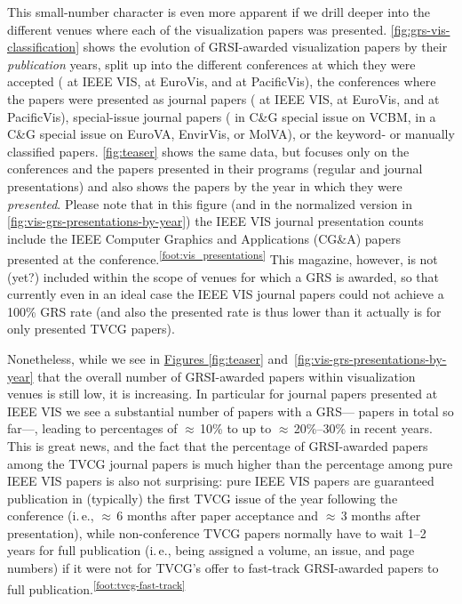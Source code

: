 \documentclass[conference]{vgtc}                     %
\newcommand{\ie}{i.\,e.}
\begin{document}
This small-number character is even more apparent if we drill deeper into the different venues where each of the visualization papers was presented. \autoref{fig:grs-vis-classification} shows the evolution of GRSI-awarded visualization papers by their \emph{publication} years, split up into the different conferences at which they were accepted (\GrsiIeeeVisPapersCount{} at IEEE VIS, \GrsiEuroVisPapersCount{} at EuroVis, and \GrsiPacificVisTvcgPapersCount{} at PacificVis), the conferences where the papers were presented as journal papers (\GrsiIeeeVisTvcgJournalPresentationsCount{} at IEEE VIS, \GrsiEuroVisJournalPresentationsCount{} at EuroVis, and \GrsiPacificVisJournalPresentationsCount{} at PacificVis), special-issue journal papers (\GrsiVcbmCagPapersCount{} in C\&G special issue on VCBM, \GrsiCagSpecialIssuesPapersCount{} in a C\&G special issue on EuroVA, EnvirVis, or MolVA), or the \GrsiVisKeywordPlusManualPapersCount{} keyword- or manually classified papers. \autoref{fig:teaser} shows the same data, but focuses only on the conferences and the papers presented in their programs (regular and journal presentations) and also shows the papers by the year in which they were \emph{presented}. Please note that in this figure (and in the normalized version in \autoref{fig:vis-grs-presentations-by-year}) the IEEE VIS journal presentation counts include the IEEE Computer Graphics and Applications (CG\&A) papers presented at the conference.\textsuperscript{\ref{foot:vis_presentations}} This magazine, however, is not (yet?) included within the scope of venues for which a GRS is awarded, so that currently even in an ideal case the IEEE VIS journal papers could not achieve a 100\% GRS rate (and also the presented rate is thus lower than it actually is for only presented TVCG papers).

Nonetheless, while we see in \hyperref[fig:teaser]{Figures \ref{fig:teaser}} and~\ref{fig:vis-grs-presentations-by-year} that the overall number of GRSI-awarded papers within visualization venues is still low, it is increasing. In particular for journal papers presented at IEEE VIS we see a substantial number of papers with a GRS---\GrsiIeeeVisTvcgJournalPresentationsCount{} papers in total so far---, leading to percentages of $\approx$\,10\% to up to $\approx$\,20\%--30\% in recent years. This is great news, and the fact that the percentage of GRSI-awarded papers among the TVCG journal papers is much higher than the percentage among pure IEEE VIS papers is also not surprising: pure IEEE VIS papers are guaranteed publication in (typically) the first TVCG issue of the year following the conference (\ie, $\approx$\,6 months after paper acceptance and $\approx$\,3 months after presentation), while non-con\-fe\-rence TVCG papers normally have to wait 1--2 years for full publication (\ie, being assigned a volume, an issue, and page numbers) if it were not for TVCG's offer to fast-track GRSI-awarded papers to full publication.\textsuperscript{\ref{foot:tvcg-fast-track}}
\end{document}
